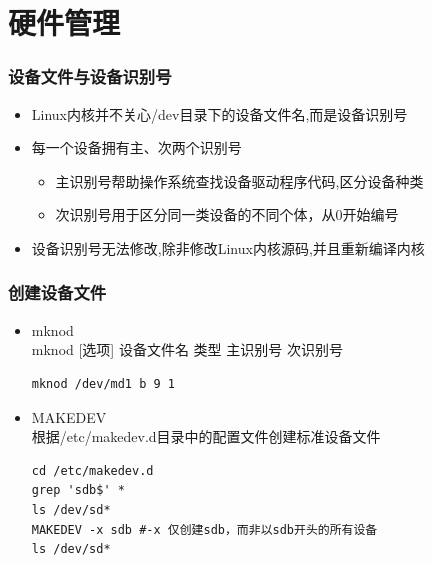 \documentclass[xcolor=svgnames,presentation]{beamer}
\begin{document}
\section{硬件管理}
\label{sec-4}
\begin{frame}
\frametitle{设备文件与设备识别号}
\label{sec-4-1}
\begin{itemize}

\item Linux内核并不关心/dev目录下的设备文件名,而是设备识别号
\label{sec-4-1-1}%

\item 每一个设备拥有主、次两个识别号
\label{sec-4-1-2}%
\begin{itemize}

\item 主识别号帮助操作系统查找设备驱动程序代码,区分设备种类
\label{sec-4-1-2-1}%

\item 次识别号用于区分同一类设备的不同个体，从0开始编号
\label{sec-4-1-2-2}%
\end{itemize} %

\item 设备识别号无法修改,除非修改Linux内核源码,并且重新编译内核
\label{sec-4-1-3}%
\end{itemize} %
\end{frame}
\begin{frame}[fragile]
\frametitle{创建设备文件}
\label{sec-4-2}
\begin{itemize}

\item mknod\\
\label{sec-4-2-1}%
mknod [选项] 设备文件名 类型 主识别号 次识别号

\begin{verbatim}
mknod /dev/md1 b 9 1
\end{verbatim}

\item MAKEDEV\\
\label{sec-4-2-2}%
根据/etc/makedev.d目录中的配置文件创建标准设备文件

\begin{verbatim}
cd /etc/makedev.d
grep 'sdb$' *
ls /dev/sd*
MAKEDEV -x sdb #-x 仅创建sdb，而非以sdb开头的所有设备
ls /dev/sd*
\end{verbatim}
\end{itemize} %
\end{frame}
\end{document}
